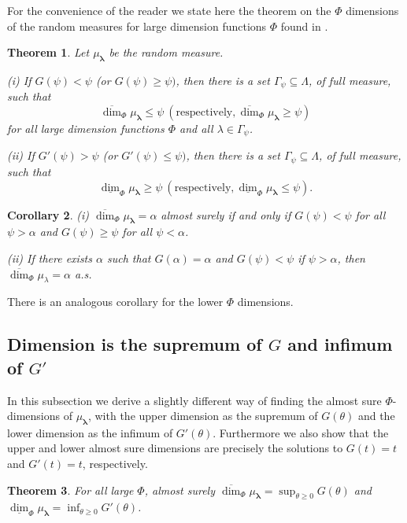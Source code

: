 \documentclass{amsart}
\newtheorem{theorem}{Theorem}
\newtheorem{corollary}[theorem]{Corollary}
\theoremstyle{plain}
\numberwithin{equation}{section}
\newcommand{\blambda}{{\boldsymbol{\lambda}}}
\newcommand{\odim}{\overline{\dim}}
\newcommand{\udim}{\underline{\dim}}
\begin{document}
For the convenience of the reader we state here the theorem on the $\Phi$
dimensions of the random measures for large dimension functions $\Phi$ found in \cite[Thm 11]{HM2}.

\begin{theorem}
\label{MainDimThm} 
Let $\mu_\blambda$ be the random measure.

(i) If $G(\psi)<\psi $ (or $G(\psi)\geq \psi)$, then there is a set $\Gamma_{\psi}\subseteq \Lambda$, of full measure, such that 
\begin{equation*}
           \odim_{\Phi}\mu_\blambda\leq \psi\  (\text{respectively}, \odim_{\Phi}\mu_\blambda\geq \psi)
\end{equation*}
for all large dimension functions $\Phi$ and all $\lambda \in \Gamma_\psi$.

(ii) If $G'(\psi)>\psi $ (or $G'(\psi)\leq \psi)$, then there is a set $\Gamma_{\psi}\subseteq \Lambda$, of full measure, such that 
\begin{equation*}
    \udim_{\Phi}\mu_\blambda\geq \psi \ (\text{respectively},  \udim_{\Phi}\mu_\blambda\leq \psi).
\end{equation*}
\end{theorem}

\begin{corollary}
(i) $\odim_{\Phi}\mu_\blambda=\alpha $ almost surely if and only if $G(\psi)<\psi $ for all $\psi >\alpha $ and $G(\psi)\geq \psi$
for all $\psi <\alpha$.

(ii) If there exists $\alpha $ such that $G(\alpha)=\alpha $ and $G(\psi)<\psi$ if $\psi >\alpha$, then 
$\odim_{\Phi}\mu_{\lambda}=\alpha $ a.s.
\end{corollary}

There is an analogous corollary for the lower $\Phi$ dimensions.

\subsection{Dimension is the supremum of $G$ and infimum of $G'$}

In this subsection we derive a slightly different way of finding the almost sure $\Phi$-dimensions of $\mu_\blambda$, with the
upper dimension as the supremum of $G(\theta)$ and the lower dimension as the infimum of $G'(\theta)$.
Furthermore we also show that the upper and lower almost sure dimensions are precisely the solutions to $G(t) = t$ and $G'(t) = t$, respectively.


\begin{theorem} \label{SupThm}
For all large $\Phi$, almost surely $\odim_\Phi\mu_\blambda=\sup_{\theta \geq 0}G(\theta)$ and 
$\udim_\Phi \mu_\blambda=\inf_{\theta \geq 0}G'(\theta)$.
\end{theorem}
\end{document}
